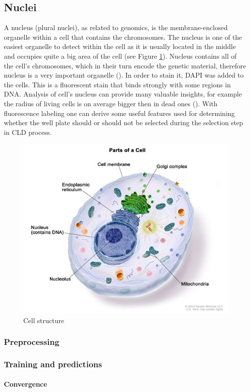 \subsection{Nuclei}
    A nucleus (plural nuclei), as related to genomics, is the membrane-enclosed organelle within a cell that contains the chromosomes. The nucleus is one of the easiest organelle to detect within the cell as it is usually located in the middle and occupies quite a big area of the cell (see Figure \ref{fig:cell}). Nucleus contains all of the cell's chromosomes, which in their turn encode the genetic material, therefore nucleus is a very important organelle (\cite{genomegov}). In order to stain it, DAPI was added to the cells. This is a fluorescent stain that binds strongly with some regions in DNA. Analysis of cell's nucleus can provide many valuable insights, for example the radius of living cells is on average bigger then in dead ones (\cite{Christiansen_2018}). With fluorescence labeling one can derive some useful features used for determining whether the well plate should or should not be selected during the selection step in CLD process.
    \begin{figure}[htb]
        \begin{center}
            \includegraphics[width=0.3\linewidth]{bilder/cell structure.png}
            \caption{Cell structure}\label{fig:cell}
        \end{center}
    \end{figure}

    \subsubsection{Preprocessing}\label{section:nuclei-preprocessing}
        
    \subsubsection{Training and predictions}
        \paragraph{Convergence}
              

